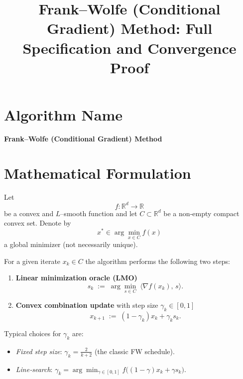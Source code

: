 \documentclass{article}
\newcommand{\R}{\mathbb{R}}
\begin{document}
\title{Frank–Wolfe (Conditional Gradient) Method: Full Specification and Convergence Proof}
\author{}
\date{}
\maketitle

\tableofcontents
\newpage

\section*{Algorithm Name}
\begin{center}
\textbf{Frank–Wolfe (Conditional Gradient) Method}
\end{center}

\section*{Mathematical Formulation}
Let 
\[
f:\R^{d}\rightarrow\R
\]
be a convex and $L$–smooth function and let $C\subset\R^{d}$ be a non‑empty compact convex set.  
Denote by 
\[
x^{*}\in\arg\min_{x\in C}f(x)
\]
a global minimizer (not necessarily unique).  

For a given iterate $x_k\in C$ the algorithm performs the following two steps:

\begin{enumerate}[label=\arabic*)]
\item \textbf{Linear minimization oracle (LMO)}  
\[
s_k \;:=\; \arg\min_{s\in C}\;\langle \nabla f(x_k),\,s\rangle .
\tag{1}
\]
\item \textbf{Convex combination update} with step size $\gamma_k\in[0,1]$  
\[
x_{k+1}\;:=\;(1-\gamma_k)x_k+\gamma_k s_k .
\tag{2}
\]
\end{enumerate}

Typical choices for $\gamma_k$ are:
\begin{itemize}
\item \emph{Fixed step size}: $\gamma_k=\frac{2}{k+2}$ (the classic FW schedule).
\item \emph{Line‑search}: $\gamma_k=\arg\min_{\gamma\in[0,1]} f\bigl((1-\gamma)x_k+\gamma s_k\bigr)$.
\end{itemize}

\end{document}
